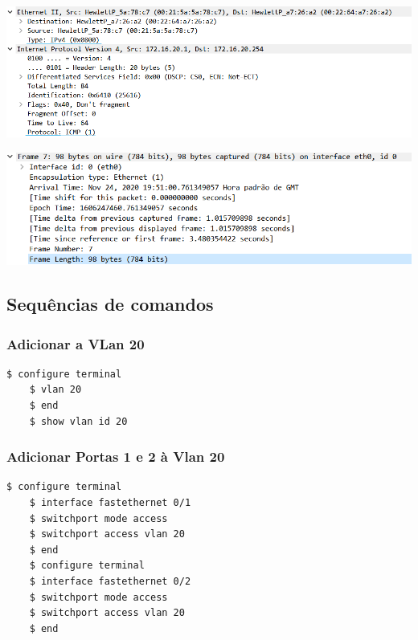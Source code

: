 \documentclass[11pt]{article}
\begin{document}
\bigskip
\bigskip

\includegraphics[width=\textwidth]{figura6.PNG}

\bigskip
\bigskip

\includegraphics[width=\textwidth]{figura7.PNG}

\pagebreak

\subsection{Sequências de comandos}

\bigskip

\subsubsection{Adicionar a VLan 20}

\begin{lstlisting}[style=bashStyle]
    $ configure terminal
    $ vlan 20
    $ end
    $ show vlan id 20
\end{lstlisting}

\bigskip

\subsubsection{Adicionar Portas 1 e 2 à Vlan 20}

\begin{lstlisting}[style=bashStyle]
    $ configure terminal
    $ interface fastethernet 0/1
    $ switchport mode access
    $ switchport access vlan 20
    $ end
    $ configure terminal
    $ interface fastethernet 0/2            
    $ switchport mode access
    $ switchport access vlan 20
    $ end
\end{lstlisting}
\end{document}
